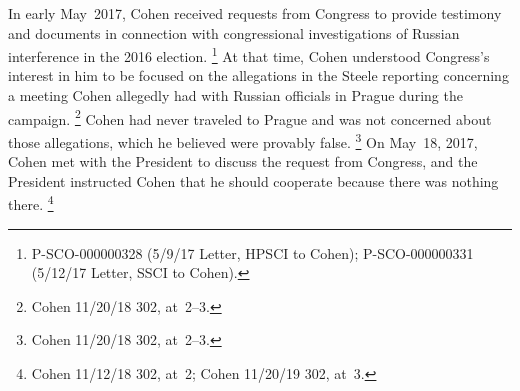 In early May~2017, Cohen received requests from Congress to provide testimony and documents in connection with congressional investigations of Russian interference in the 2016 election.%
\footnote{P-SCO-000000328 (5/9/17 Letter, HPSCI to Cohen);
P-SCO-000000331 (5/12/17 Letter, SSCI to Cohen).}
At that time, Cohen understood Congress's interest in him to be focused on the allegations in the Steele reporting concerning a meeting Cohen allegedly had with Russian officials in Prague during the campaign.%
\footnote{Cohen 11/20/18 302, at~2--3.}
Cohen had never traveled to Prague and was not concerned about those allegations, which he believed were provably false.%
\footnote{Cohen 11/20/18 302, at~2--3.}
On May~18, 2017, Cohen met with the President to discuss the request from Congress, and the President instructed Cohen that he should cooperate because there was nothing there.%
\footnote{Cohen 11/12/18 302, at~2;
Cohen 11/20/19 302, at~3.}

